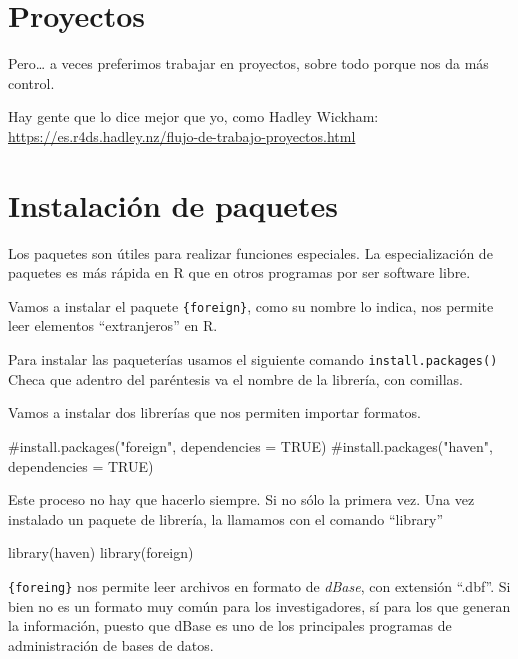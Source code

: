 \documentclass[
  letterpaper,
  DIV=11,
  numbers=noendperiod]{scrreprt}
\newenvironment{Shaded}{\begin{snugshade}}{\end{snugshade}}
\newcommand{\CommentTok}[1]{\textcolor[rgb]{0.37,0.37,0.37}{#1}}
\newcommand{\FunctionTok}[1]{\textcolor[rgb]{0.28,0.35,0.67}{#1}}
\newcommand{\NormalTok}[1]{\textcolor[rgb]{0.00,0.23,0.31}{#1}}
\begin{document}
\hypertarget{proyectos}{%
\section{Proyectos}\label{proyectos}}

Pero\ldots{} a veces preferimos trabajar en proyectos, sobre todo porque
nos da más control.

Hay gente que lo dice mejor que yo, como Hadley Wickham:
\url{https://es.r4ds.hadley.nz/flujo-de-trabajo-proyectos.html}

\hypertarget{instalaciuxf3n-de-paquetes}{%
\section{Instalación de paquetes}\label{instalaciuxf3n-de-paquetes}}

Los paquetes son útiles para realizar funciones especiales. La
especialización de paquetes es más rápida en R que en otros programas
por ser software libre.

Vamos a instalar el paquete \texttt{\{foreign\}}, como su nombre lo
indica, nos permite leer elementos ``extranjeros'' en R.

Para instalar las paqueterías usamos el siguiente comando
\texttt{install.packages()} Checa que adentro del paréntesis va el
nombre de la librería, con comillas.

Vamos a instalar dos librerías que nos permiten importar formatos.

\begin{Shaded}
\begin{Highlighting}[]
\CommentTok{\#install.packages("foreign", dependencies = TRUE)}
\CommentTok{\#install.packages("haven", dependencies = TRUE)}
\end{Highlighting}
\end{Shaded}

Este proceso no hay que hacerlo siempre. Si no sólo la primera vez. Una
vez instalado un paquete de librería, la llamamos con el comando
``library''

\begin{Shaded}
\begin{Highlighting}[]
\FunctionTok{library}\NormalTok{(haven)}
\FunctionTok{library}\NormalTok{(foreign)}
\end{Highlighting}
\end{Shaded}

\texttt{\{foreing\}} nos permite leer archivos en formato de
\emph{dBase}, con extensión ``.dbf''. Si bien no es un formato muy común
para los investigadores, sí para los que generan la información, puesto
que dBase es uno de los principales programas de administración de bases
de datos.
\end{document}
